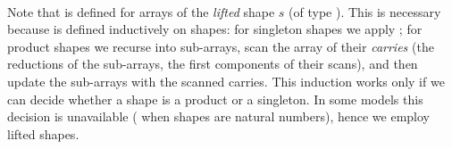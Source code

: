 \begin{code}[hide]%
%
\>[2]\AgdaSpace{}%
\AgdaSymbol{:}\AgdaSpace{}%
\AgdaSpace{}%
\AgdaSpace{}%
\AgdaSpace{}%
\AgdaSymbol{(}\AgdaSpace{}%
\AgdaSymbol{:}\AgdaSpace{}%
\AgdaSpace{}%
\AgdaSpace{}%
\AgdaSpace{}%
\AgdaSpace{}%
\AgdaSymbol{)}\AgdaSpace{}%
\AgdaSpace{}%
\AgdaSpace{}%
\AgdaSpace{}%
\AgdaSpace{}%
\AgdaSpace{}%
\AgdaSpace{}%
\AgdaSpace{}%
\AgdaSpace{}%
\AgdaSpace{}%
\<%
\\
%
\>[2]\AgdaSpace{}%
\AgdaSymbol{:}\AgdaSpace{}%
\AgdaSpace{}%
\AgdaSpace{}%
\AgdaSpace{}%
\AgdaSymbol{(}\AgdaSpace{}%
\AgdaSymbol{:}\AgdaSpace{}%
\AgdaSpace{}%
\AgdaSpace{}%
\AgdaSpace{}%
\AgdaSpace{}%
\AgdaSymbol{)}\AgdaSpace{}%
\AgdaSpace{}%
\AgdaSpace{}%
\AgdaSpace{}%
\AgdaSpace{}%
\AgdaSpace{}%
\AgdaSpace{}%
\AgdaSpace{}%
\AgdaSpace{}%
\AgdaSpace{}%
\AgdaSpace{}%
\AgdaSpace{}%
\AgdaSpace{}%
\AgdaSpace{}%
\<%
\end{code}
Note that  is defined for arrays of the \emph{lifted} shape $s$
(of type ).  This is necessary because  is defined
inductively on shapes: for singleton shapes we apply ; for
product shapes we recurse into sub-arrays, scan the array of their
\emph{carries} (the reductions of the sub-arrays, \ie{} the first components
of their scans), and then update the sub-arrays with the scanned carries.  This induction works only if
we can decide whether a shape is a product or a singleton.  In some models this
decision is unavailable (\eg{} when shapes are natural numbers), hence we employ
lifted shapes.

